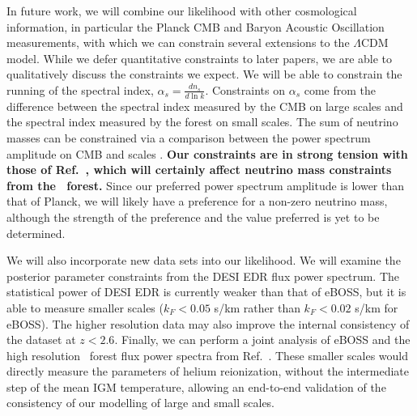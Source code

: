 In future work, we will combine our \Lya likelihood with other cosmological information, in particular the Planck CMB and Baryon Acoustic Oscillation measurements, with which we can constrain several extensions to the $\Lambda$CDM model.
While we defer quantitative constraints to later papers, we are able to qualitatively discuss the constraints we expect.
We will be able to constrain the running of the spectral index, $\alpha_s = \frac{d n_s}{d \ln k}$.
Constraints on $\alpha_s$ come from the difference between the spectral index measured by the CMB on large scales and the spectral index measured by the \Lya forest on small scales.
The sum of neutrino masses can be constrained via a comparison between the power spectrum amplitude on CMB and \Lya scales \cite{2020JCAP...04..025P}. \textbf{Our constraints are in strong tension with those of Ref.~\cite{2020JCAP...04..038P}, which will certainly affect neutrino mass constraints from the \Lya~forest.}
Since our preferred power spectrum amplitude is lower than that of Planck, we will likely have a preference for a non-zero neutrino mass, although the strength of the preference and the value preferred is yet to be determined. 

We will also incorporate new data sets into our likelihood.
We will examine the posterior parameter constraints from the DESI EDR flux power spectrum.
The statistical power of DESI EDR is currently weaker than that of eBOSS, but it is able to measure smaller scales ($k_F < 0.05$ s/km rather than $k_F < 0.02$ s/km for eBOSS).
The higher resolution data may also improve the internal consistency of the dataset at $z < 2.6$.
Finally, we can perform a joint analysis of eBOSS and the high resolution \Lya~forest flux power spectra from Ref.~\cite{2022MNRAS.509.2842K}.
These smaller scales would directly measure the parameters of helium reionization, without the intermediate step of the mean IGM temperature, allowing an end-to-end validation of the consistency of our modelling of large and small scales.
